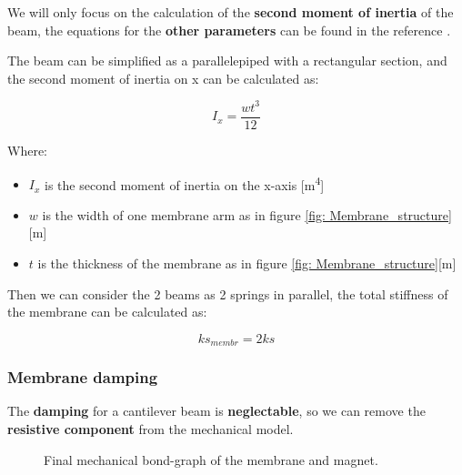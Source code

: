 We will only focus on the calculation of the \textbf{second moment of inertia} of the beam, the equations for the \textbf{other parameters} can be found in the reference \cite{statics_fixed_beam}.

\begin{samepage}
    The beam can be simplified as a parallelepiped with a rectangular section, and the second moment of inertia on x can be calculated as:
    \nopagebreak
    
    \begin{equation}
        I_x = \frac{w t^3}{12}
        \label{eq: Beam_inertia}
    \end{equation}
    \nopagebreak

    Where:
    \nopagebreak
    
    \begin{itemize}
        \item $I_x$ is the second moment of inertia on the x-axis [m\textsuperscript{4}]
        \item $w$ is the width of one membrane arm as in figure \ref{fig: Membrane_structure}[m]
        \item $t$ is the thickness of the membrane as in figure \ref{fig: Membrane_structure}[m]
    \end{itemize}
\end{samepage}

\pagebreak

\begin{samepage}
    Then we can consider the 2 beams as 2 springs in parallel, the total stiffness of the membrane can be calculated as:
    \nopagebreak

    \begin{equation*}
        ks_{membr} = 2 ks
    \end{equation*}
\end{samepage}


\begin{samepage}
    \subsubsection{Membrane damping}
    \nopagebreak

    The \textbf{damping} for a cantilever beam is \textbf{neglectable}, so we can remove the \textbf{resistive component} from the mechanical model.
    \nopagebreak

    \begin{figure}[H]
        \centering
        \resizebox{.45\linewidth}{!}{
                
        }
        \caption{Final mechanical bond-graph of the membrane and magnet.}
        \label{fig:Membrane_bond graph_without_damping}
    \end{figure}
\end{samepage}

